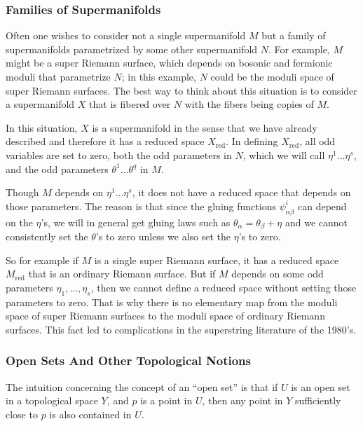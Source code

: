 \documentclass[11pt,a4paper]{article}
\def\red{{\mathrm{red}}}
\begin{document}
\subsubsection{Families of Supermanifolds}\label{families}

Often one wishes to consider not a single supermanifold $M$ but a family of supermanifolds parametrized by some other supermanifold $N$.  For example,
$M$ might be a super Riemann surface, which depends on bosonic and fermionic moduli that parametrize $N$; in this example, $N$  could be the moduli
space of super Riemann surfaces.  The best way to think about this situation is to consider a supermanifold $X$ that is fibered over $N$ with the fibers being copies
of $M$.

In this situation, $X$ is a supermanifold in the sense that we have already described and therefore it has a reduced space $X_\red$.   In defining $X_\red$,
all odd variables are set to zero, both the odd parameters in $N$, which we will call $\eta^1\dots\eta^s$, and the odd parameters $\theta^1\dots\theta^q$
in $M$.

Though $M$ depends on $\eta^1\dots\eta^s$, it does not have a reduced space that depends on those parameters.  The reason is
that since the gluing functions $\psi^i_{\alpha\beta}$ can depend on the $\eta$'s, we will in general get gluing laws such as $\theta_\alpha=\theta_\beta+\eta$ and
we cannot consistently set the $\theta$'s to zero unless we also set the $\eta$'s to zero.

So for example if $M$ is a single super Riemann surface, it has a reduced space $M_\red$ that is an ordinary Riemann surface.  But if $M$ depends on some odd parameters
$\eta_1,\dots,\eta_s$, then we cannot define a reduced space without setting those parameters to zero.  That is why there is no elementary map from the moduli space
of super Riemann surfaces to the moduli space of ordinary Riemann surfaces.  This fact led to complications in the superstring literature of the 1980's.


\subsubsection{Open Sets And Other Topological Notions}\label{opensets}

The intuition concerning the concept of an ``open set'' is that if $U$ is an 
open set in a topological space $Y$, and $p$ is a point in $U$, then any point in $Y$
 sufficiently close to $p$ is also contained
in $U$.  
\end{document}
